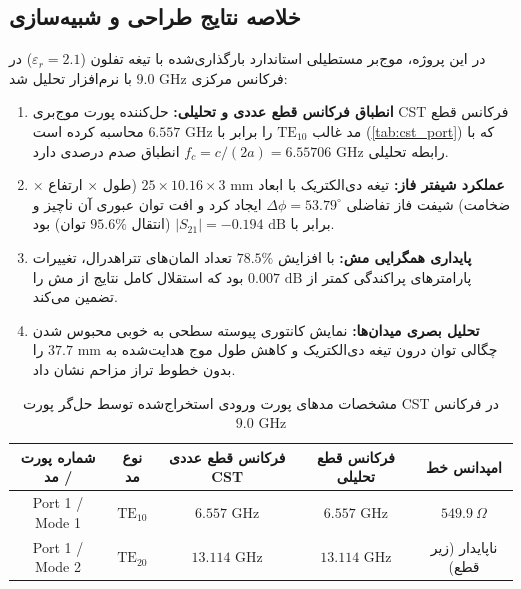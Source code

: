\documentclass[11pt,a4paper]{article}
\begin{document}
\subsection{خلاصه نتایج طراحی و شبیه‌سازی}
در این پروژه، موج‌بر مستطیلی استاندارد  بارگذاری‌شده با تیغه تفلون ($\varepsilon_r = 2.1$) در فرکانس مرکزی $9.0\text{ GHz}$ با نرم‌افزار  تحلیل شد:
\begin{enumerate}
    \item \textbf{انطباق فرکانس قطع عددی و تحلیلی:} حل‌کننده پورت موج‌بری CST فرکانس قطع مد غالب $\text{TE}_{10}$ را برابر با $6.557\text{ GHz}$ محاسبه کرده است (\autoref{tab:cst_port}) که با رابطه تحلیلی $f_c = c / (2a) = 6.55706\text{ GHz}$ انطباق صدم درصدی دارد.
    \item \textbf{عملکرد شیفتر فاز:} تیغه دی‌الکتریک با ابعاد $25 \times 10.16 \times 3\text{ mm}$ (طول $\times$ ارتفاع $\times$ ضخامت) شیفت فاز تفاضلی $\Delta\phi = 53.79^\circ$ ایجاد کرد و افت توان عبوری آن ناچیز و برابر با $|S_{21}| = -0.194\text{ dB}$ (انتقال $95.6\%$ توان) بود.
    \item \textbf{پایداری همگرایی مش:} با افزایش $78.5\%$ تعداد المان‌های تتراهدرال، تغییرات پارامترهای پراکندگی کمتر از $0.007\text{ dB}$ بود که استقلال کامل نتایج از مش را تضمین می‌کند.
    \item \textbf{تحلیل بصری میدان‌ها:} نمایش کانتوری پیوسته سطحی به خوبی محبوس شدن چگالی توان درون تیغه دی‌الکتریک و کاهش طول موج هدایت‌شده به $37.7\text{ mm}$ را بدون خطوط تراز مزاحم نشان داد.
\end{enumerate}

\begin{table}[!htbp]
    \centering
    \caption{مشخصات مدهای پورت ورودی استخراج‌شده توسط حل‌گر پورت CST در فرکانس $9.0\text{ GHz}$}
    \vspace{0.2cm}
    \begin{tabular}{|c|c|c|c|c|}
        \hline
        \textbf{شماره پورت / مد} & \textbf{نوع مد} & \textbf{فرکانس قطع عددی CST} & \textbf{فرکانس قطع تحلیلی} & \textbf{امپدانس خط} \\
        \hline
        Port 1 / Mode 1 & $\text{TE}_{10}$ & $6.557\text{ GHz}$ & $6.557\text{ GHz}$ & $549.9\ \Omega$ \\
        \hline
        Port 1 / Mode 2 & $\text{TE}_{20}$ & $13.114\text{ GHz}$ & $13.114\text{ GHz}$ & ناپایدار (زیر قطع) \\
        \hline
    \end{tabular}
    \label{tab:cst_port}
\end{table}
\end{document}
